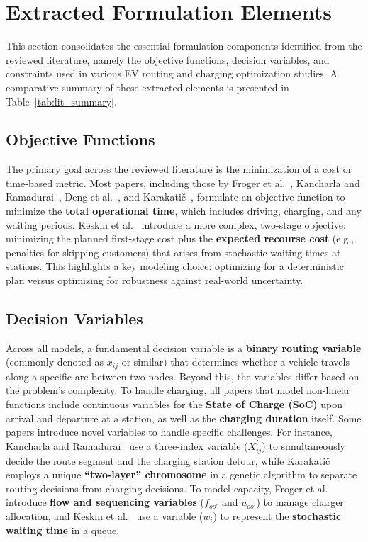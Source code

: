 \section{Extracted Formulation Elements}
This section consolidates the essential formulation components identified from the reviewed literature, namely the objective functions, decision variables, and constraints used in various EV routing and charging optimization studies. A comparative summary of these extracted elements is presented in Table~\ref{tab:lit_summary}.

\subsection{Objective Functions}
The primary goal across the reviewed literature is the minimization of a cost or time-based metric. Most papers, including those by Froger et al.~\cite{Froger2022}, Kancharla and Ramadurai~\cite{Kancharla2020}, Deng et al.~\cite{Deng2024}, and Karakatič~\cite{Karakatic2021}, formulate an objective function to minimize the \textbf{total operational time}, which includes driving, charging, and any waiting periods. Keskin et al.~\cite{Keskin2021} introduce a more complex, two-stage objective: minimizing the planned first-stage cost plus the \textbf{expected recourse cost} (e.g., penalties for skipping customers) that arises from stochastic waiting times at stations. This highlights a key modeling choice: optimizing for a deterministic plan versus optimizing for robustness against real-world uncertainty.

\subsection{Decision Variables}
Across all models, a fundamental decision variable is a \textbf{binary routing variable} (commonly denoted as $x_{ij}$ or similar) that determines whether a vehicle travels along a specific arc between two nodes. Beyond this, the variables differ based on the problem's complexity. To handle charging, all papers that model non-linear functions include continuous variables for the \textbf{State of Charge (SoC)} upon arrival and departure at a station, as well as the \textbf{charging duration} itself. Some papers introduce novel variables to handle specific challenges. For instance, Kancharla and Ramadurai~\cite{Kancharla2020} use a three-index variable ($X_{ij}^l$) to simultaneously decide the route segment and the charging station detour, while Karakatič~\cite{Karakatic2021} employs a unique \textbf{``two-layer'' chromosome} in a genetic algorithm to separate routing decisions from charging decisions. To model capacity, Froger et al.~\cite{Froger2022} introduce \textbf{flow and sequencing variables} ($f_{oo'}$ and $u_{oo'}$) to manage charger allocation, and Keskin et al.~\cite{Keskin2021} use a variable ($w_i$) to represent the \textbf{stochastic waiting time} in a queue.

